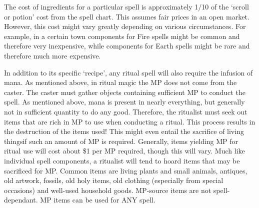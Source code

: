 \documentclass[twoside]{book}
\begin{document}
    {  
      The cost of ingredients for a particular spell is
               approximately 1/10 of the `scroll or potion'
               cost from the spell chart. This assumes fair prices in an
               open market. However, this cost might vary greatly
               depending on various circumstances. For example, in a
               certain town components for Fire spells might be common
               and therefore very inexpensive, while components for Earth
               spells might be rare and therefore much more expensive.
               
    }
  
    {  
      In addition to its specific `recipe',
               any ritual spell will also require the infusion of mana.
               As mentioned above, in ritual magic the MP does not come
               from the caster. The caster must gather objects containing
               sufficient MP to conduct the spell. As mentioned above,
               mana is present in nearly everything, but generally not in
               sufficient quantity to do any good. Therefore, the
               ritualist must seek out items that are rich in MP to use
               when conducting a ritual. This process results in the
               destruction of the items used! This might even entail the
               sacrifice of living thingsif such an amount of MP
               is required. Generally, items yielding MP for ritual use
               will cost about \$1 per MP required, though this will vary.
               Much like individual spell components, a ritualist will
               tend to hoard items that may be sacrificed for MP. Common
               items are living plants and small animals, antiques, old
               artwork, fossils, old holy items, old clothing (especially
               from special occasions) and well-used household goods.
               MP-source items are not spell-dependant. MP items can be
               used for ANY spell. 
    }
  
\end{document}
